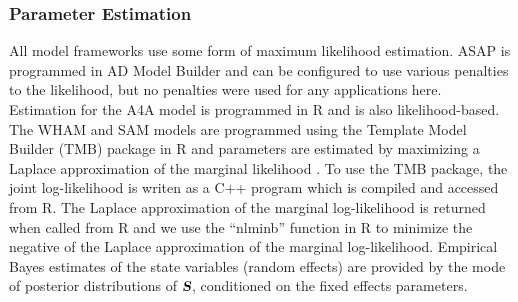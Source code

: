 \documentclass[12pt,letterpaper, leqno]{article}
\begin{document}





\subsubsection*{Parameter Estimation}


All model frameworks use some form of maximum likelihood estimation. ASAP is programmed in AD Model Builder \citep{fournieretal12} and can be configured to use various penalties to the likelihood, but no penalties were used for any applications here. Estimation for the A4A model is programmed in R \citep{R18} and is also likelihood-based. The WHAM and SAM models are programmed using the Template Model Builder (TMB) package in R \citep{kristensenetal16} and parameters are estimated by maximizing a Laplace approximation of the marginal likelihood \citep{skaugfournier06}. To use the TMB package, the joint log-likelihood is writen as a C++ program which is compiled and accessed from R. The Laplace approximation of the marginal log-likelihood is returned when called from R and we use the ``nlminb'' function in R to minimize the negative of the Laplace approximation of the marginal log-likelihood. Empirical Bayes estimates of the state variables (random effects) are provided by the mode of posterior distributions of $\textsl{\textbf{S}}$, conditioned on the fixed effects parameters.
\end{document}
